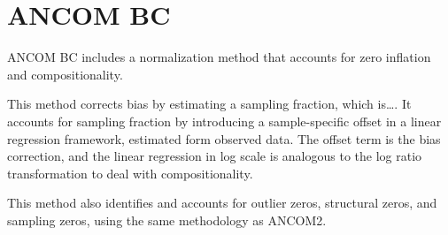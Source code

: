\documentclass[
]{book}
\newenvironment{Shaded}{\begin{snugshade}}{\end{snugshade}}
\newcommand{\CommentTok}[1]{\textcolor[rgb]{0.56,0.35,0.01}{\textit{#1}}}
\newcommand{\DataTypeTok}[1]{\textcolor[rgb]{0.13,0.29,0.53}{#1}}
\newcommand{\KeywordTok}[1]{\textcolor[rgb]{0.13,0.29,0.53}{\textbf{#1}}}
\newcommand{\NormalTok}[1]{#1}
\newcommand{\OperatorTok}[1]{\textcolor[rgb]{0.81,0.36,0.00}{\textbf{#1}}}
\newcommand{\StringTok}[1]{\textcolor[rgb]{0.31,0.60,0.02}{#1}}
\begin{document}
\begin{Shaded}
\end{Shaded}

\hypertarget{ancom-bc}{%
\section{ANCOM BC}\label{ancom-bc}}

ANCOM BC \citep{lin2020} includes a normalization method that accounts for zero inflation and compositionality.

This method corrects bias by estimating a sampling fraction, which is\ldots. It accounts for sampling fraction by introducing a sample-specific offset in a linear regression framework, estimated form observed data. The offset term is the bias correction, and the linear regression in log scale is analogous to the log ratio transformation to deal with compositionality.

This method also identifies and accounts for outlier zeros, structural zeros, and sampling zeros, using the same methodology as ANCOM2.
\end{document}
